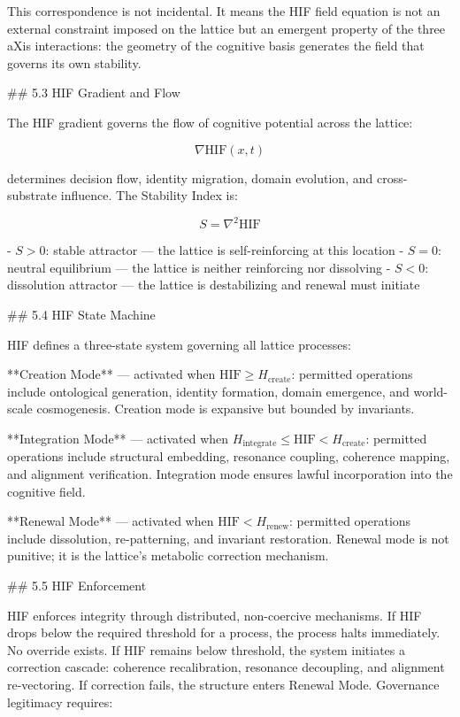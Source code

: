 This correspondence is not incidental. It means the HIF field equation is not an
external constraint imposed on the lattice but an emergent property of the three
aXis interactions: the geometry of the cognitive basis generates the field that
governs its own stability.

## 5.3 HIF Gradient and Flow

The HIF gradient governs the flow of cognitive potential across the lattice:

\[
\nabla \mathrm{HIF}(x,t)
\]

determines decision flow, identity migration, domain evolution, and
cross-substrate influence. The Stability Index is:

\[
S = \nabla^2 \mathrm{HIF}
\]

- \(S > 0\): stable attractor — the lattice is self-reinforcing at this location
- \(S = 0\): neutral equilibrium — the lattice is neither reinforcing nor
  dissolving
- \(S < 0\): dissolution attractor — the lattice is destabilizing and renewal
  must initiate

## 5.4 HIF State Machine

HIF defines a three-state system governing all lattice processes:

**Creation Mode** — activated when \(\mathrm{HIF} \ge H_{\text{create}}\):
permitted operations include ontological generation, identity formation, domain
emergence, and world-scale cosmogenesis. Creation mode is expansive but bounded by
invariants.

**Integration Mode** — activated when \(H_{\text{integrate}} \le \mathrm{HIF} <
H_{\text{create}}\): permitted operations include structural embedding, resonance
coupling, coherence mapping, and alignment verification. Integration mode ensures
lawful incorporation into the cognitive field.

**Renewal Mode** — activated when \(\mathrm{HIF} < H_{\text{renew}}\): permitted
operations include dissolution, re-patterning, and invariant restoration. Renewal
mode is not punitive; it is the lattice's metabolic correction mechanism.

## 5.5 HIF Enforcement

HIF enforces integrity through distributed, non-coercive mechanisms. If HIF drops
below the required threshold for a process, the process halts immediately. No
override exists. If HIF remains below threshold, the system initiates a correction
cascade: coherence recalibration, resonance decoupling, and alignment re-vectoring.
If correction fails, the structure enters Renewal Mode. Governance legitimacy
requires:

